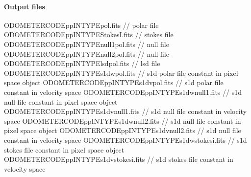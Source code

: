 \documentclass[a4paper,10pt,english]{report}
\begin{document}
\paragraph{Output files}
\label{\detokenize{user/spirou/recipes/polar:output-files}}
\begin{sphinxVerbatim}[commandchars=\\\{\}]
ODOMETER\PYGZus{}CODE\PYGZus{}pp\PYGZus{}INTYPE\PYGZus{}pol.fits               // polar file
ODOMETER\PYGZus{}CODE\PYGZus{}pp\PYGZus{}INTYPE\PYGZus{}StokesI.fits           // stokes file
ODOMETER\PYGZus{}CODE\PYGZus{}pp\PYGZus{}INTYPE\PYGZus{}null1\PYGZus{}pol.fits         // null  file
ODOMETER\PYGZus{}CODE\PYGZus{}pp\PYGZus{}INTYPE\PYGZus{}null2\PYGZus{}pol.fits         // null  file
ODOMETER\PYGZus{}CODE\PYGZus{}pp\PYGZus{}INTYPE\PYGZus{}lsd\PYGZus{}pol.fits           // lsd file
ODOMETER\PYGZus{}CODE\PYGZus{}pp\PYGZus{}INTYPE\PYGZus{}s1d\PYGZus{}w\PYGZus{}pol.fits         // s1d polar file constant in pixel space  object
ODOMETER\PYGZus{}CODE\PYGZus{}pp\PYGZus{}INTYPE\PYGZus{}s1d\PYGZus{}v\PYGZus{}pol.fits         // s1d polar file constant in velocity space
ODOMETER\PYGZus{}CODE\PYGZus{}pp\PYGZus{}INTYPE\PYGZus{}s1d\PYGZus{}w\PYGZus{}null1.fits       // s1d null  file constant in pixel space  object
ODOMETER\PYGZus{}CODE\PYGZus{}pp\PYGZus{}INTYPE\PYGZus{}s1d\PYGZus{}v\PYGZus{}null1.fits       // s1d null  file constant in velocity space
ODOMETER\PYGZus{}CODE\PYGZus{}pp\PYGZus{}INTYPE\PYGZus{}s1d\PYGZus{}w\PYGZus{}null2.fits       // s1d null  file constant in pixel space  object
ODOMETER\PYGZus{}CODE\PYGZus{}pp\PYGZus{}INTYPE\PYGZus{}s1d\PYGZus{}v\PYGZus{}null2.fits       // s1d null  file constant in velocity space
ODOMETER\PYGZus{}CODE\PYGZus{}pp\PYGZus{}INTYPE\PYGZus{}s1d\PYGZus{}w\PYGZus{}stokesi.fits     // s1d stokes file constant in pixel space  object
ODOMETER\PYGZus{}CODE\PYGZus{}pp\PYGZus{}INTYPE\PYGZus{}s1d\PYGZus{}v\PYGZus{}stokesi.fits     // s1d stokes file constant in velocity space
\end{sphinxVerbatim}
\end{document}
